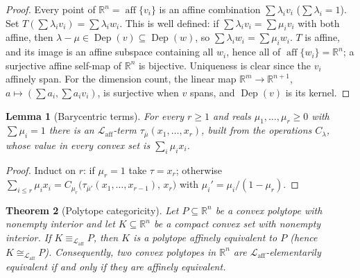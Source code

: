\documentclass[11pt]{amsart}
\newtheorem{theorem}{Theorem}[section]
\newtheorem{lemma}[theorem]{Lemma}
\theoremstyle{definition}
\newcommand{\R}{\mathbb{R}}
\newcommand{\Laff}{\mathcal{L}_{\mathrm{aff}}}
\newcommand{\Dep}{\operatorname{Dep}}
\newcommand{\aff}{\operatorname{aff}}
\begin{document}
\begin{proof}
Every point of $\R^n=\aff\{v_i\}$ is an affine combination $\sum\lambda_i
v_i$ ($\sum\lambda_i=1$). Set $T(\sum\lambda_i v_i)=\sum\lambda_i w_i$. This
is well defined: if $\sum\lambda_i v_i=\sum\mu_i v_i$ with both affine, then
$\lambda-\mu\in\Dep(v)\subseteq\Dep(w)$, so $\sum\lambda_i w_i=\sum\mu_i
w_i$. $T$ is affine, and its image is an affine subspace containing all
$w_i$, hence all of $\aff\{w_i\}=\R^n$; a surjective affine self-map of
$\R^n$ is bijective. Uniqueness is clear since the $v_i$ affinely span. For
the dimension count, the linear map $\R^m\to\R^{n+1}$,
$a\mapsto(\sum a_i,\sum a_iv_i)$, is surjective when $v$ spans, and
$\Dep(v)$ is its kernel.
\end{proof}

\begin{lemma}[Barycentric terms]\label{lem:terms}
For every $r\ge1$ and reals $\mu_1,\dots,\mu_r\ge0$ with $\sum\mu_i=1$
there is an $\Laff$-term $\tau_{\bar\mu}(x_1,\dots,x_r)$, built from the
operations $C_\lambda$, whose value in every convex set is
$\sum_i\mu_i x_i$.
\end{lemma}

\begin{proof}
Induct on $r$: if $\mu_r=1$ take $\tau=x_r$; otherwise
$\sum_{i\le r}\mu_i x_i =
C_{\mu_r}\bigl(\tau_{\bar\mu'}(x_1,\dots,x_{r-1}),\,x_r\bigr)$ with
$\mu_i'=\mu_i/(1-\mu_r)$.
\end{proof}

\begin{theorem}[Polytope categoricity]\label{thm:polytope}
Let $P\subseteq\R^n$ be a convex polytope with nonempty interior and let
$K\subseteq\R^n$ be a compact convex set with nonempty interior. If
$K\equiv_{\Laff}P$, then $K$ is a polytope affinely equivalent to $P$ (hence
$K\cong_{\Laff}P$). Consequently, two convex polytopes in $\R^n$ are
$\Laff$-elementarily equivalent if and only if they are affinely equivalent.
\end{theorem}
\end{document}
